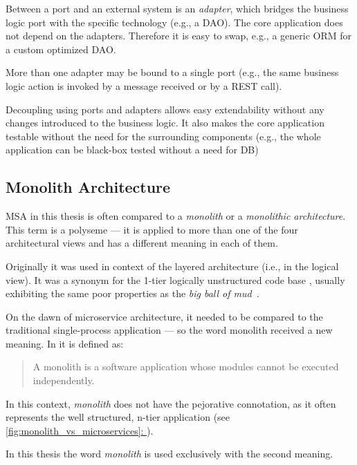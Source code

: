 \documentclass[thesis=M,english,hidelinks]{FITthesis}[2012/10/20]
\newcommand*{\fullref}[1]{\hyperref[{#1}]{\autoref*{#1}: \textit{\nameref*{#1}}}}
\begin{document}
Between a port and an external system is an \textit{adapter}, which bridges the business logic port with the specific technology (e.g., a \acrlong{DAO}). The core application does not depend on the adapters. Therefore it is easy to swap, e.g., a generic \acrshort{ORM} for a custom optimized \acrshort{DAO}.

More than one adapter may be bound to a single port (e.g., the same business logic action is invoked by a message received or by a \acrshort{REST} call).

Decoupling using ports and adapters allows easy extendability without any changes introduced to the business logic. It also makes the core application testable without the need for the surrounding components (e.g., the whole application can be black-box tested without a need for \acrshort{DB})

\subsection{Monolith Architecture}

\acrshort{MSA} in this thesis is often compared to a \textit{monolith} or a \textit{monolithic architecture}. This term is a polyseme --- it is applied to more than one of the four architectural views and has a different meaning in each of them.

Originally it was used in context of the layered architecture (i.e., in the logical view). It was a synonym for the 1-tier logically unstructured code base \cite{professional-asp, wiki-monolith}, usually exhibiting the same poor properties as the \textit{big ball of mud}~\cite{big-ball-mud}.

On the dawn of microservice architecture, it needed to be compared to the traditional single-process application --- so the word monolith received a new meaning. In \cite{ms-today-tomorrow} it is defined as:

\begin{quote}
    A monolith is a software application whose modules cannot be executed independently.
\end{quote}

In this context, \textit{monolith} does not have the pejorative connotation, as it often represents the well structured, n-tier application (see \fullref{fig:monolith_vs_microservices}).

In this thesis the word \textit{monolith} is used exclusively with the second meaning.

% 
% 
\end{document}
